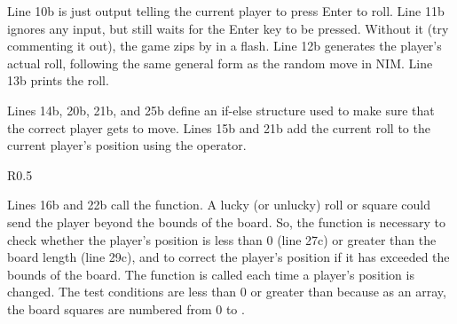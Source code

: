 Line 10b is just output telling the current player to press Enter to roll. Line 11b ignores any input, but still waits for the Enter key to be pressed.  Without it (try commenting it out), the game zips by in a flash.  Line 12b generates the player's actual roll, following the same general form as the random move in NIM.  
Line 13b prints the roll.  %


Lines 14b, 20b, 21b, and 25b define an if-else structure used to make sure that the correct player gets to move.  Lines 15b and 21b add the current roll to the current player's position using the \codefont{+=} operator.


\begin{wrapfigure}{R}{0.5\textwidth} 
\vspace{-0.5cm}
\end{wrapfigure}

 Lines 16b and 22b call the  function.
A lucky (or unlucky) roll or square could send the player beyond the bounds of the board.  So, the  function is necessary to check whether the player's position is less than 0 (line 27c) or greater than the board length (line 29c), and to correct the player's position if it has exceeded the bounds of the board.
The  function is called each time a player's position is changed. 
The test conditions are less than 0 or greater than  because as an array, the board squares are numbered from 0 to .

